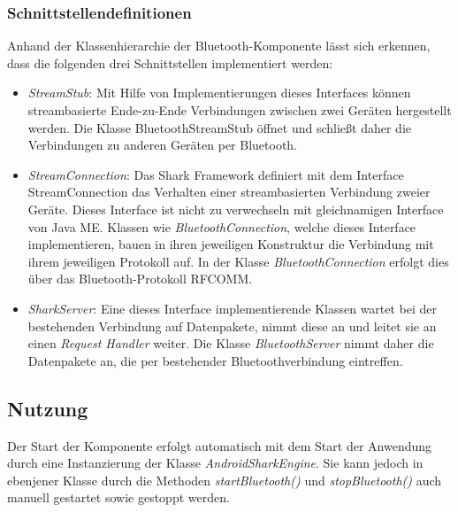\subsubsection{Schnittstellendefinitionen}\label{ch:bluetoothinterfaces}
Anhand der Klassenhierarchie der Bluetooth-Komponente lässt sich erkennen, dass die folgenden drei Schnittstellen implementiert werden:
\begin{itemize}
	\item \textit{StreamStub}: Mit Hilfe von Implementierungen dieses Interfaces können streambasierte Ende-zu-Ende Verbindungen zwischen zwei Geräten hergestellt werden. Die Klasse BluetoothStreamStub öffnet und schließt daher die Verbindungen zu anderen Geräten per Bluetooth.
	\item \textit{StreamConnection}: Das Shark Framework definiert mit dem Interface StreamConnection das Verhalten einer streambasierten Verbindung zweier Geräte. Dieses Interface ist nicht zu verwechseln mit gleichnamigen Interface von Java ME. Klassen wie \textit{BluetoothConnection}, welche dieses Interface implementieren, bauen in ihren jeweiligen Konstruktur die Verbindung mit ihrem jeweiligen Protokoll auf. In der Klasse \textit{BluetoothConnection} erfolgt dies über das Bluetooth-Protokoll RFCOMM.
	\item \textit{SharkServer}: Eine dieses Interface implementierende Klassen wartet bei der bestehenden Verbindung auf Datenpakete, nimmt diese an und leitet sie an einen \textit{Request Handler} weiter. Die Klasse \textit{BluetoothServer} nimmt daher die Datenpakete an, die per bestehender Bluetoothverbindung eintreffen.

\end{itemize}

\subsection{Nutzung}
Der Start der Komponente erfolgt automatisch mit dem Start der Anwendung durch eine Instanzierung der Klasse \textit{AndroidSharkEngine}. Sie kann jedoch in ebenjener Klasse durch die Methoden \textit{startBluetooth()} und \textit{stopBluetooth()} auch manuell gestartet sowie gestoppt werden.

